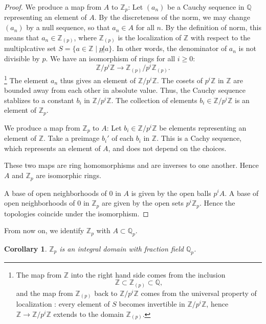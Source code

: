 \documentclass{amsart}
\newcommand{\ring}[1]{\mathbb{#1}}
\newtheorem{corollary}[equation]{Corollary}
\begin{document}
\begin{proof}
  We produce a map from $A$ to $\ring{Z}_p$: Let $(a_n)$ be a Cauchy
  sequence in $\ring{Q}$ representing an element of $A$.  By the
  discreteness of the norm, we may change $(a_n)$ by a null sequence,
  so that $a_n\in A$ for all $n$.  By the definition of norm, this
  means that $a_n \in \ring{Z}_{(p)}$, where $\ring{Z}_{(p)}$ is the
  localization of $\ring{Z}$ with respect to the multiplcative set $S
  = \{a\in\ring{Z}\mid p \not| a\}$.  In other words, the denominator
  of $a_n$ is not divisible by $p$.  We have an isomorphism of rings
  for all $i\ge0$:
\[
\ring{Z}/p^i\ring{Z} \to \ring{Z}_{(p)}/p^i\ring{Z}_{(p)}.
\]
\footnote{The map from $\ring{Z}$ into the right hand side comes from the inclusion
\[
\ring{Z}\subset\ring{Z}_{(p)}\subset \ring{Q},
\]
and the map from $\ring{Z}_{(p)}$ back to $\ring{Z}/p^i\ring{Z}$ comes
from the universal property of localization \cite[8.46]{knapp-basic}: 
every element of $S$
becomes invertible in $\ring{Z}/p^i\ring{Z}$, hence
$\ring{Z}\to\ring{Z}/p^i\ring{Z}$ extends to the domain $\ring{Z}_{(p)}$.}
The element $a_n$ thus gives an element of $\ring{Z}/p^i\ring{Z}$.
The cosets of $p^i\ring{Z}$ in $\ring{Z}$ are bounded away from each
other in absolute value.  Thus, the Cauchy sequence stablizes to
a constant $b_i$ in $\ring{Z}/p^i\ring{Z}$.  The collection of
elements $b_i\in\ring{Z}/p^i\ring{Z}$ is an element of $\ring{Z}_p$.

We produce a map from $\ring{Z}_p$ to $A$: Let
$b_i\in\ring{Z}/p^i\ring{Z}$ be elements representing an element of
$\ring{Z}$.  Take a preimage $b_i'$ of each $b_i$ in $\ring{Z}$.  This
is a Cachy sequence, which represents an element of $A$, and does not
depend on the choices.

These two maps are ring homomorphisms and are inverses to one another.
Hence $A$ and $\ring{Z}_p$ are isomorphic rings.

A base of open neighborhoods of $0$ in $A$ is given by the open balls
$p^i A$.  A base of open neighborhoods of $0$ in $\ring{Z}_p$ are
given by the open sets $p^i\ring{Z}_p$.  Hence the topologies coincide
under the isomorphism.
\end{proof}

From now on, we identify $\ring{Z}_p$ with $A\subset\ring{Q}_p$.

\begin{corollary} $\ring{Z}_p$ is an integral domain with fraction field $\ring{Q}_p$.
\end{corollary}
\end{document}
